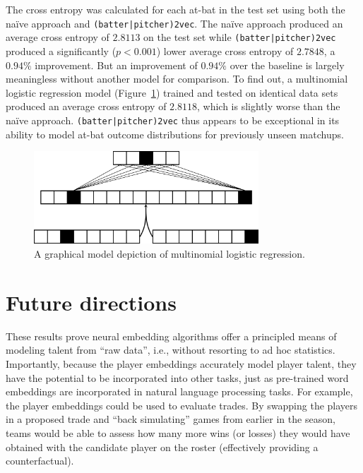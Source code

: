 \documentclass{article}
\begin{document}
The cross entropy was calculated for each at-bat in the test set using both the naïve approach and \texttt{(batter|pitcher)2vec}. The naïve approach produced an average cross entropy of $2.8113$ on the test set while \texttt{(batter|pitcher)2vec} produced a significantly ($p < 0.001$) lower average cross entropy of $2.7848$, a $0.94\%$ improvement. But an improvement of $0.94\%$ over the baseline is largely meaningless without another model for comparison. To find out, a multinomial logistic regression model (Figure~\ref{fig:log_reg}) trained and tested on identical data sets produced an average cross entropy of $2.8118$, which is slightly worse than the naïve approach. \texttt{(batter|pitcher)2vec} thus appears to be exceptional in its ability to model at-bat outcome distributions for previously unseen matchups.

\begin{figure}[h]
\centering
\includegraphics[width=0.75\textwidth,height=\textheight,keepaspectratio]{logistic_regression.png}
\caption{A graphical model depiction of multinomial logistic regression.}
\label{fig:log_reg}
\end{figure}

\section{Future directions}
\label{future}

These results prove neural embedding algorithms offer a principled means of modeling talent from ``raw data'', i.e., without resorting to ad hoc statistics. Importantly, because the player embeddings accurately model player talent, they have the potential to be incorporated into other tasks, just as pre-trained word embeddings are incorporated in natural language processing tasks. For example, the player embeddings could be used to evaluate trades. By swapping the players in a proposed trade and ``back simulating'' games from earlier in the season, teams would be able to assess how many more wins (or losses) they would have obtained with the candidate player on the roster (effectively providing a counterfactual).
\end{document}
